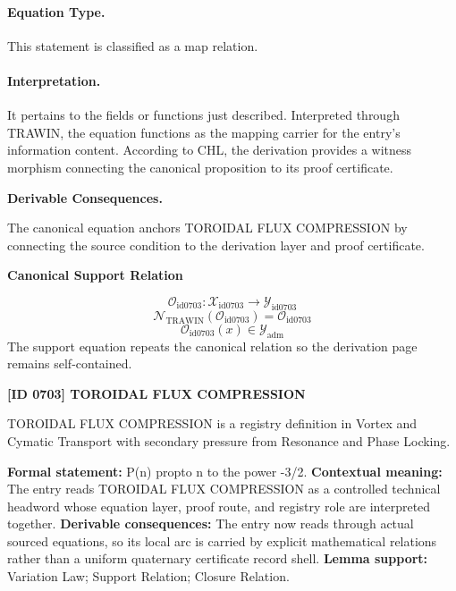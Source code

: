 \paragraph{Equation Type.}
This statement is classified as a map relation.

\paragraph{Interpretation.}
It pertains to the fields or functions just described. Interpreted through TRAWIN, the equation functions as the mapping carrier for the entry’s information content. According to CHL, the derivation provides a witness morphism connecting the canonical proposition to its proof certificate.

\par\vspace{0.35em}
\noindent\textbf{Derivable Consequences.}\quad
\begingroup
\footnotesize
\raggedright
The canonical equation anchors TOROIDAL FLUX COMPRESSION by connecting the source condition to the derivation layer and proof certificate.
\par\endgroup

\noindent\textbf{Canonical Support Relation}\par
\[
\mathcal{O}_{\mathrm{id0703}}:\mathcal{X}_{\mathrm{id0703}}\longrightarrow\mathcal{Y}_{\mathrm{id0703}}
\]
\[
\mathcal{N}_{\mathrm{TRAWIN}}(\mathcal{O}_{\mathrm{id0703}})=\mathcal{O}_{\mathrm{id0703}}
\]
\[
\mathcal{O}_{\mathrm{id0703}}(x)\in\mathcal{Y}_{\mathrm{adm}}
\]
\noindent The support equation repeats the canonical relation so the derivation page remains self-contained.\par

\clearpage
\noindent\textbf{[ID 0703] TOROIDAL FLUX COMPRESSION}\par
\vspace{0.35em}
\begingroup\small
{}
TOROIDAL FLUX COMPRESSION is a registry definition in Vortex and Cymatic Transport with secondary pressure from Resonance and Phase Locking.

\begingroup\footnotesize\setlength{\emergencystretch}{3em}\sloppy
\textbf{Formal statement:} P(n) propto n to the power -3/2. \textbf{Contextual meaning:} The entry reads TOROIDAL FLUX COMPRESSION as a controlled technical headword whose equation layer, proof route, and registry role are interpreted together. \textbf{Derivable consequences:} The entry now reads through actual sourced equations, so its local arc is carried by explicit mathematical relations rather than a uniform quaternary certificate record shell. \textbf{Lemma support:} Variation Law; Support Relation; Closure Relation.\par
\endgroup

